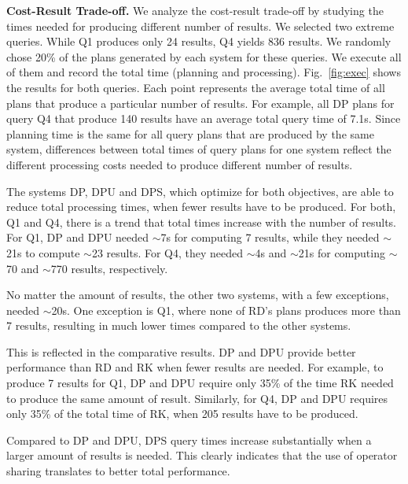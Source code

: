 \textbf{Cost-Result Trade-off.} We analyze the cost-result trade-off
by studying the times needed for producing different number of
results. We selected two extreme queries. While Q1 produces only 24
results, Q4 yields 836 results. We randomly chose 20\% of the plans
generated by each system for these queries. We execute all of them and
record the total time (planning and processing). Fig.~\ref{fig:exec}
shows the results for both queries. Each point represents the
average total time of all plans that produce a particular number of
results. For example, all DP plans for query Q4 that produce 140
results have an average total query time of 7.1s. Since planning time
is the same for all query plans that are produced by the same system,
differences between total times of query plans for one system reflect
the different processing costs needed to produce different number of
results.

The systems DP, DPU and DPS, which optimize for both objectives, are
able to reduce total processing times, when fewer results have to be
produced. For both, Q1 and Q4, there is a trend that total times
increase with the number of results. For Q1, DP and DPU needed
$\sim$7s for computing 7 results, while they needed $\sim$21s to
compute $\sim$23 results. For Q4, they needed $\sim$4s and $\sim$21s
for computing $\sim$70 and $\sim$770 results, respectively.

No matter the amount of results, the other two systems, with a few
exceptions, needed $\sim$20s. One exception is Q1, where none of RD's
plans produces more than 7 results, resulting in much lower times
compared to the other systems.

This is reflected in the comparative results. DP and DPU provide
better performance than RD and RK when fewer results are needed.  For
example, to produce 7 results for Q1, DP and DPU require only 35\% of
the time RK needed to produce the same amount of result. Similarly,
for Q4, DP and DPU requires only 35\% of the total time of RK, when
205 results have to be produced.

Compared to DP and DPU, DPS query times increase substantially when a
larger amount of results is needed. This clearly indicates that the
use of operator sharing translates to better total performance.


